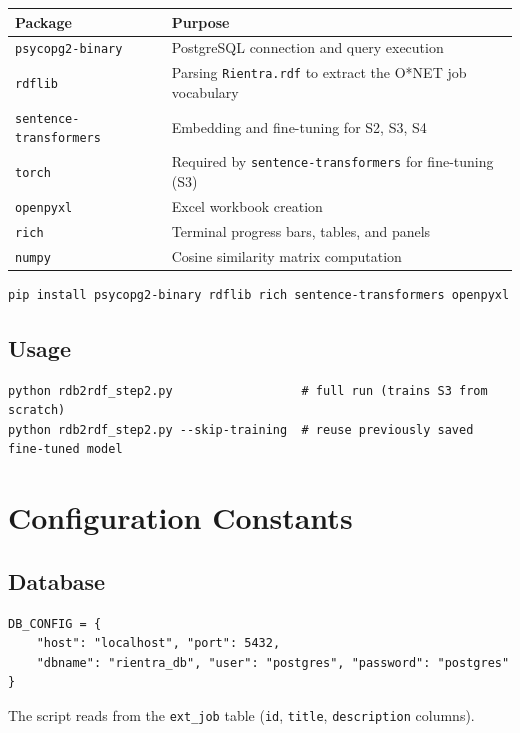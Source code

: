﻿\documentclass[12pt,a4paper]{article}
\begin{document}
\begin{longtable}{@{}P{4cm}P{10.5cm}@{}}
\toprule
\textbf{Package} & \textbf{Purpose} \\
\midrule
\endhead
\texttt{psycopg2-binary} & PostgreSQL connection and query execution \\
\texttt{rdflib} & Parsing \texttt{Rientra.rdf} to extract the O*NET job vocabulary \\
\texttt{sentence-transformers} & Embedding and fine-tuning for S2, S3, S4 \\
\texttt{torch} & Required by \texttt{sentence-transformers} for fine-tuning (S3) \\
\texttt{openpyxl} & Excel workbook creation \\
\texttt{rich} & Terminal progress bars, tables, and panels \\
\texttt{numpy} & Cosine similarity matrix computation \\
\bottomrule
\end{longtable}

\begin{lstlisting}
pip install psycopg2-binary rdflib rich sentence-transformers openpyxl
\end{lstlisting}

\subsection{Usage}

\begin{lstlisting}
python rdb2rdf_step2.py                  # full run (trains S3 from scratch)
python rdb2rdf_step2.py --skip-training  # reuse previously saved fine-tuned model
\end{lstlisting}

\clearpage
\section{Configuration Constants}

\subsection{Database}

\begin{lstlisting}
DB_CONFIG = {
    "host": "localhost", "port": 5432,
    "dbname": "rientra_db", "user": "postgres", "password": "postgres"
}
\end{lstlisting}

The script reads from the \texttt{ext\_job} table (\texttt{id}, \texttt{title}, \texttt{description} columns).
\end{document}
